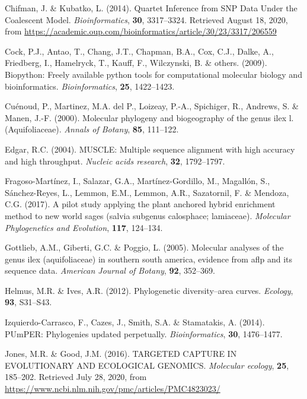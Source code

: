 \documentclass[]{article}
\begin{document}
\leavevmode\hypertarget{ref-chifman2014quartet}{}%
Chifman, J. \& Kubatko, L. (2014). Quartet Inference from SNP Data Under the Coalescent Model. \emph{Bioinformatics}, \textbf{30}, 3317--3324. Retrieved August 18, 2020, from \url{https://academic.oup.com/bioinformatics/article/30/23/3317/206559}

\leavevmode\hypertarget{ref-cock2009biopython}{}%
Cock, P.J., Antao, T., Chang, J.T., Chapman, B.A., Cox, C.J., Dalke, A., Friedberg, I., Hamelryck, T., Kauff, F., Wilczynski, B. \& others. (2009). Biopython: Freely available python tools for computational molecular biology and bioinformatics. \emph{Bioinformatics}, \textbf{25}, 1422--1423.

\leavevmode\hypertarget{ref-cuenoud2000molecular}{}%
Cuénoud, P., Martinez, M.A. del P., Loizeay, P.-A., Spichiger, R., Andrews, S. \& Manen, J.-F. (2000). Molecular phylogeny and biogeography of the genus ilex l.(Aquifoliaceae). \emph{Annals of Botany}, \textbf{85}, 111--122.

\leavevmode\hypertarget{ref-edgar2004muscle}{}%
Edgar, R.C. (2004). MUSCLE: Multiple sequence alignment with high accuracy and high throughput. \emph{Nucleic acids research}, \textbf{32}, 1792--1797.

\leavevmode\hypertarget{ref-fragoso2017pilot}{}%
Fragoso-Martínez, I., Salazar, G.A., Martínez-Gordillo, M., Magallón, S., Sánchez-Reyes, L., Lemmon, E.M., Lemmon, A.R., Sazatornil, F. \& Mendoza, C.G. (2017). A pilot study applying the plant anchored hybrid enrichment method to new world sages (salvia subgenus calosphace; lamiaceae). \emph{Molecular Phylogenetics and Evolution}, \textbf{117}, 124--134.

\leavevmode\hypertarget{ref-gottlieb2005molecular}{}%
Gottlieb, A.M., Giberti, G.C. \& Poggio, L. (2005). Molecular analyses of the genus ilex (aquifoliaceae) in southern south america, evidence from aflp and its sequence data. \emph{American Journal of Botany}, \textbf{92}, 352--369.

\leavevmode\hypertarget{ref-helmus2012phylogenetic}{}%
Helmus, M.R. \& Ives, A.R. (2012). Phylogenetic diversity--area curves. \emph{Ecology}, \textbf{93}, S31--S43.

\leavevmode\hypertarget{ref-izquierdo2014pumper}{}%
Izquierdo-Carrasco, F., Cazes, J., Smith, S.A. \& Stamatakis, A. (2014). PUmPER: Phylogenies updated perpetually. \emph{Bioinformatics}, \textbf{30}, 1476--1477.

\leavevmode\hypertarget{ref-jones2016targeted}{}%
Jones, M.R. \& Good, J.M. (2016). TARGETED CAPTURE IN EVOLUTIONARY AND ECOLOGICAL GENOMICS. \emph{Molecular ecology}, \textbf{25}, 185--202. Retrieved July 28, 2020, from \url{https://www.ncbi.nlm.nih.gov/pmc/articles/PMC4823023/}
\end{document}
